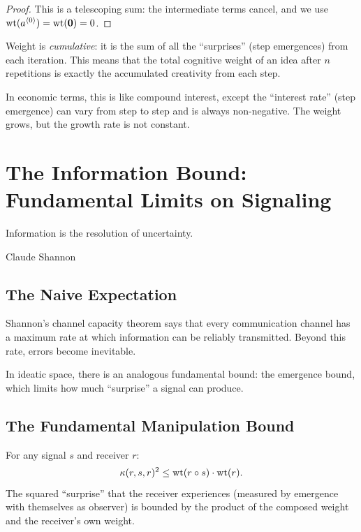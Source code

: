 \begin{proof}
This is a telescoping sum: the intermediate terms cancel, and we use $\operatorname{wt}(a^{\langle 0 \rangle}) = \operatorname{wt}(\mathbf{0}) = 0$.
\end{proof}

\begin{interpretation}
Weight is \emph{cumulative}: it is the sum of all the ``surprises'' (step emergences) from each iteration. This means that the total cognitive weight of an idea after $n$ repetitions is exactly the accumulated creativity from each step.

In economic terms, this is like compound interest, except the ``interest rate'' (step emergence) can vary from step to step and is always non-negative. The weight grows, but the growth rate is not constant.
\end{interpretation}


\chapter{The Information Bound: Fundamental Limits on Signaling}

\epigraph{Information is the resolution of uncertainty.}{Claude Shannon}

\section{The Naive Expectation}

Shannon's channel capacity theorem says that every communication channel has a maximum rate at which information can be reliably transmitted. Beyond this rate, errors become inevitable.

In ideatic space, there is an analogous fundamental bound: the emergence bound, which limits how much ``surprise'' a signal can produce.

\section{The Fundamental Manipulation Bound}

\begin{theorem}
\label{thm:manipulation-bound}
For any signal $s$ and receiver $r$:
\[
\kappa(r, s, r)^2 \leq \operatorname{wt}(r \circ s) \cdot \operatorname{wt}(r).
\]
The squared ``surprise'' that the receiver experiences (measured by emergence with themselves as observer) is bounded by the product of the composed weight and the receiver's own weight.
\end{theorem}

